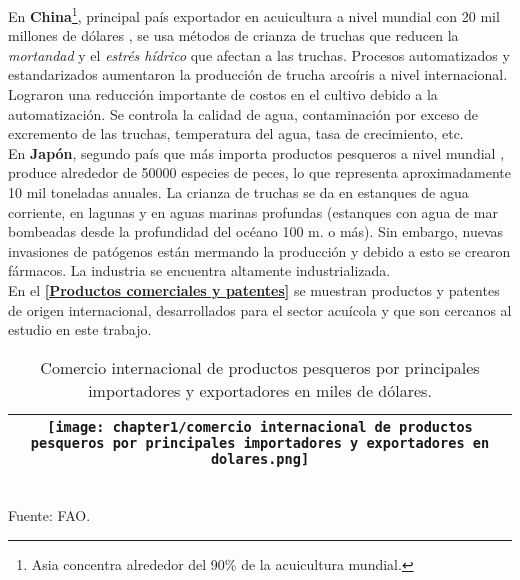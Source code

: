 En \textbf{China}\footnote{Asia concentra alrededor del 90\% de la acuicultura mundial.\cite{Powell2003}}, principal país exportador en acuicultura a nivel mundial con 20 mil millones de dólares \cite[p.~44]{FAO2017}, se usa métodos de crianza de truchas que reducen la \textit{mortandad} y el \textit{estrés hídrico} que afectan a las truchas. Procesos automatizados y estandarizados aumentaron la producción de trucha arcoíris a nivel internacional. Lograron una reducción importante de costos en el cultivo debido a la automatización. Se controla la calidad de agua, contaminación por exceso de excremento de las truchas, temperatura del agua, tasa de crecimiento, etc. \cite[p.~1-6]{2017}\\
En \textbf{Japón}, segundo país que más importa productos pesqueros a nivel mundial \cite[p.~44]{FAO2017}, produce alrededor de 50000 especies de peces, lo que representa aproximadamente 10 mil toneladas anuales. La crianza de truchas se da en estanques de agua corriente, en lagunas y en aguas marinas profundas (estanques con agua de mar bombeadas desde la profundidad del océano 100 m. o más). Sin embargo, nuevas invasiones de patógenos están mermando la producción y debido a esto se crearon fármacos. La industria se encuentra altamente industrializada. \cite[p.~1-5]{2005} \\

En el \textbf{\ref{Productos comerciales y patentes}} se muestran productos y patentes de origen internacional, desarrollados para el sector acuícola y que son cercanos al estudio en este trabajo.

\begin{table}[H]
	\centering	
	\caption{Comercio internacional de productos pesqueros por principales importadores y exportadores en miles de dólares.}
	\label{tbl:comercio internacional de productos pesqueros por principales importadores y exportadores en dolares}
	\begin{tabular}{ | c | }
		\hline
		\begin{minipage}{1\textwidth}
			\texttt{[image: chapter1/comercio internacional de productos pesqueros por principales importadores y exportadores en dolares.png]}
		\end{minipage}		
		\\ \hline
	\end{tabular}
	\\	Fuente: FAO.
\end{table}

